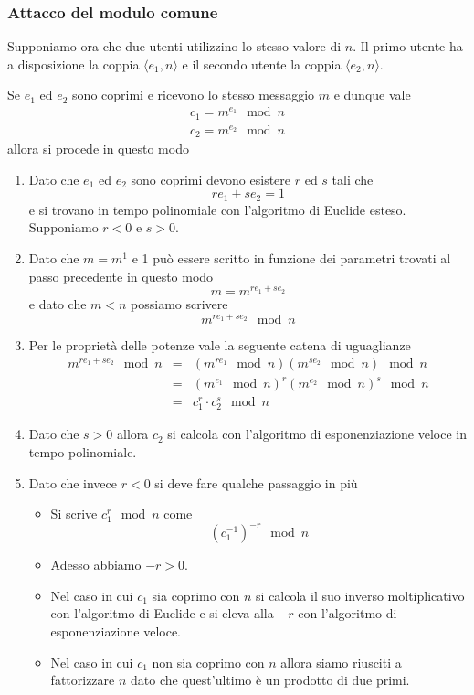 \subsubsection{Attacco del modulo comune}
Supponiamo ora che due utenti utilizzino lo stesso valore di $n$. Il primo utente ha a disposizione la coppia
$\langle e_1, n \rangle$ e il secondo utente la coppia $\langle e_2, n \rangle$.

Se $e_1$ ed $e_2$ sono coprimi e ricevono lo stesso messaggio $m$ e dunque vale
\[
	\begin{matrix}
		c_1 = m^{e_1} \mod{n} \\
		c_2 = m^{e_2} \mod{n}
	\end{matrix}
\]
allora si procede in questo modo
\begin{enumerate}
	\item Dato che $e_1$ ed $e_2$ sono coprimi devono esistere $r$ ed $s$ tali che
	      \[ r e_1 + s e_2 = 1 \]
	      e si trovano in tempo polinomiale con l'algoritmo di Euclide esteso. Supponiamo $r < 0$ e $s > 0$.
	\item Dato che $m = m^1$ e 1 pu\`o essere scritto in funzione dei parametri trovati al passo precedente in
	      questo modo
	      \[ m = m^{r e_1 + s e_2} \]
	      e dato che $m < n$ possiamo scrivere
	      \[ m^{r e_1 + s e_2} \mod{n} \]
	\item Per le propriet\`a delle potenze vale la seguente catena di uguaglianze
	      \[
		      \begin{array}{rcl}
			      m^{r e_1 + s e_2} \mod{n} & = & (m^{r e_1} \mod{n}) (m^{s e_2} \mod{n}) \mod{n} \\
			                                & = & (m^{e_1} \mod{n})^r (m^{e_2} \mod{n})^s \mod{n} \\
			                                & = & c_1^r \cdot c_2^s \mod{n}
		      \end{array}
	      \]
	\item Dato che $s > 0$ allora $c_2$ si calcola con l'algoritmo di esponenziazione veloce in tempo polinomiale.
	\item Dato che invece $r < 0$ si deve fare qualche passaggio in pi\`u
	      \begin{itemize}
		      \item Si scrive $c_1^r \mod{n}$ come
		            \[ (c_1^{-1})^{-r} \mod{n} \]
		      \item Adesso abbiamo $-r > 0$.
		      \item Nel caso in cui $c_1$ sia coprimo con $n$ si calcola il suo inverso moltiplicativo con
		            l'algoritmo di Euclide e si eleva alla $-r$ con l'algoritmo di esponenziazione veloce.
		      \item Nel caso in cui $c_1$ non sia coprimo con $n$ allora siamo riusciti a fattorizzare $n$ dato
		            che quest'ultimo \`e un prodotto di due primi.
	      \end{itemize}
\end{enumerate}

